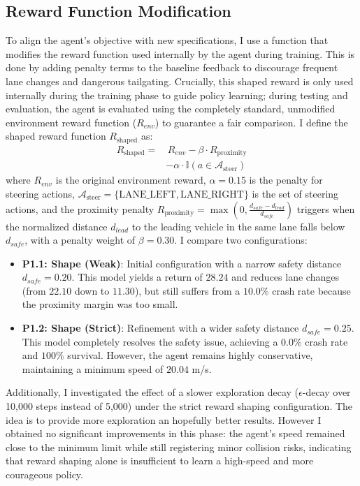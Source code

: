 \documentclass{article}
\begin{document}
\subsection{Reward Function Modification}
To align the agent's objective with new specifications, I use a function that modifies the reward function used internally by the agent during training. This is done by adding penalty terms to the baseline feedback to discourage frequent lane changes and dangerous tailgating. Crucially, this shaped reward is only used internally during the training phase to guide policy learning; during testing and evaluation, the agent is evaluated using the completely standard, unmodified environment reward function ($R_{env}$) to guarantee a fair comparison. I define the shaped reward function $R_{\text{shaped}}$ as:
\begin{equation}
\begin{split}
    R_{\text{shaped}} = & \, R_{env} - \beta \cdot R_{\text{proximity}} \\
    & - \alpha \cdot \mathbb{I}(a \in \mathcal{A}_{\text{steer}})
\end{split}
\end{equation}
where $R_{env}$ is the original environment reward, $\alpha = 0.15$ is the penalty for steering actions, $\mathcal{A}_{\text{steer}} = \{\text{LANE\_LEFT}, \text{LANE\_RIGHT}\}$ is the set of steering actions, and the proximity penalty $R_{\text{proximity}} = \max\left(0, \frac{d_{safe} - d_{lead}}{d_{safe}}\right)$ triggers when the normalized distance $d_{lead}$ to the leading vehicle in the same lane falls below $d_{safe}$, with a penalty weight of $\beta = 0.30$. I compare two configurations:
\begin{itemize}
    \item \textbf{P1.1: Shape (Weak)}: Initial configuration with a narrow safety distance $d_{safe} = 0.20$. This model yields a return of $28.24$ and reduces lane changes (from $22.10$ down to $11.30$), but still suffers from a $10.0\%$ crash rate because the proximity margin was too small.
    \item \textbf{P1.2: Shape (Strict)}: Refinement with a wider safety distance $d_{safe} = 0.25$. This model completely resolves the safety issue, achieving a $0.0\%$ crash rate and $100\%$ survival. However, the agent remains highly conservative, maintaining a minimum speed of $20.04$ m/s.
\end{itemize}

Additionally, I investigated the effect of a slower exploration decay ($\epsilon$-decay over 10,000 steps instead of 5,000) under the strict reward shaping configuration. The idea is to provide more exploration an hopefully better results. However I obtained no significant improvements in this phase: the agent's speed remained close to the minimum limit while still registering minor collision risks, indicating that reward shaping alone is insufficient to learn a high-speed and more courageous policy.
\end{document}
